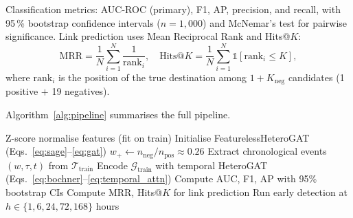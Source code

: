 \documentclass[10pt,journal]{IEEEtran}
\begin{document}
Classification metrics: AUC-ROC (primary), F1, AP, precision, and
recall, with 95\,\% bootstrap confidence intervals ($n{=}1{,}000$) and
McNemar's test for pairwise significance. Link prediction uses Mean
Reciprocal Rank and Hits@$K$:
\begin{equation}
  \text{MRR} = \frac{1}{N}\sum_{i=1}^{N}\frac{1}{\text{rank}_i},
  \quad
  \text{Hits@}K = \frac{1}{N}\sum_{i=1}^{N}\mathbb{1}[\text{rank}_i \leq K],
  \label{eq:mrr}
\end{equation}
where $\text{rank}_i$ is the position of the true destination among
$1{+}K_{\text{neg}}$ candidates (1 positive $+$ 19 negatives).

Algorithm~\ref{alg:pipeline} summarises the full pipeline.

\begin{algorithm}[t]
\caption{Coordination Detection Pipeline}
\label{alg:pipeline}
\DontPrintSemicolon
{}
\BlankLine
{}
Z-score normalise features (fit on train)\;
\BlankLine
{}
Initialise FeaturelessHeteroGAT (Eqs.~\ref{eq:sage}--\ref{eq:gat})\;
$w_+ \gets n_{\text{neg}} / n_{\text{pos}} \approx 0.26$ 
\BlankLine
{}
Extract chronological events $(w, \tau, t)$ from $\mathcal{T}_{\text{train}}$\;
Encode $\mathcal{G}_{\text{train}}$ with temporal HeteroGAT (Eqs.~\ref{eq:bochner}--\ref{eq:temporal_attn})\;
\BlankLine
{}
Compute AUC, F1, AP with 95\% bootstrap CIs\;
Compute MRR, Hits@$K$ for link prediction\;
Run early detection at $h \in \{1, 6, 24, 72, 168\}$ hours\;
\end{algorithm}
\end{document}
